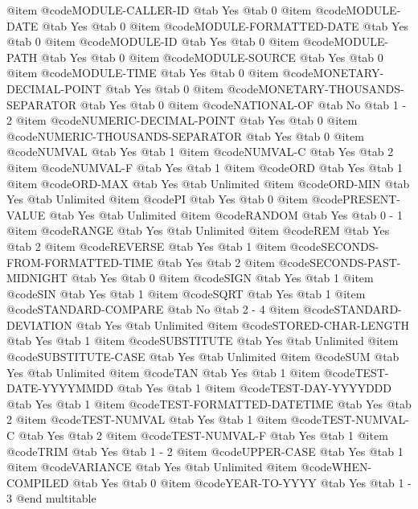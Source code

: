 @item @code{MODULE-CALLER-ID} @tab Yes @tab 0
@item @code{MODULE-DATE} @tab Yes @tab 0
@item @code{MODULE-FORMATTED-DATE} @tab Yes @tab 0
@item @code{MODULE-ID} @tab Yes @tab 0
@item @code{MODULE-PATH} @tab Yes @tab 0
@item @code{MODULE-SOURCE} @tab Yes @tab 0
@item @code{MODULE-TIME} @tab Yes @tab 0
@item @code{MONETARY-DECIMAL-POINT} @tab Yes @tab 0
@item @code{MONETARY-THOUSANDS-SEPARATOR} @tab Yes @tab 0
@item @code{NATIONAL-OF} @tab No @tab 1 - 2
@item @code{NUMERIC-DECIMAL-POINT} @tab Yes @tab 0
@item @code{NUMERIC-THOUSANDS-SEPARATOR} @tab Yes @tab 0
@item @code{NUMVAL} @tab Yes @tab 1
@item @code{NUMVAL-C} @tab Yes @tab 2
@item @code{NUMVAL-F} @tab Yes @tab 1
@item @code{ORD} @tab Yes @tab 1
@item @code{ORD-MAX} @tab Yes @tab Unlimited
@item @code{ORD-MIN} @tab Yes @tab Unlimited
@item @code{PI} @tab Yes @tab 0
@item @code{PRESENT-VALUE} @tab Yes @tab Unlimited
@item @code{RANDOM} @tab Yes @tab 0 - 1
@item @code{RANGE} @tab Yes @tab Unlimited
@item @code{REM} @tab Yes @tab 2
@item @code{REVERSE} @tab Yes @tab 1
@item @code{SECONDS-FROM-FORMATTED-TIME} @tab Yes @tab 2
@item @code{SECONDS-PAST-MIDNIGHT} @tab Yes @tab 0
@item @code{SIGN} @tab Yes @tab 1
@item @code{SIN} @tab Yes @tab 1
@item @code{SQRT} @tab Yes @tab 1
@item @code{STANDARD-COMPARE} @tab No @tab 2 - 4
@item @code{STANDARD-DEVIATION} @tab Yes @tab Unlimited
@item @code{STORED-CHAR-LENGTH} @tab Yes @tab 1
@item @code{SUBSTITUTE} @tab Yes @tab Unlimited
@item @code{SUBSTITUTE-CASE} @tab Yes @tab Unlimited
@item @code{SUM} @tab Yes @tab Unlimited
@item @code{TAN} @tab Yes @tab 1
@item @code{TEST-DATE-YYYYMMDD} @tab Yes @tab 1
@item @code{TEST-DAY-YYYYDDD} @tab Yes @tab 1
@item @code{TEST-FORMATTED-DATETIME} @tab Yes @tab 2
@item @code{TEST-NUMVAL} @tab Yes @tab 1
@item @code{TEST-NUMVAL-C} @tab Yes @tab 2
@item @code{TEST-NUMVAL-F} @tab Yes @tab 1
@item @code{TRIM} @tab Yes @tab 1 - 2
@item @code{UPPER-CASE} @tab Yes @tab 1
@item @code{VARIANCE} @tab Yes @tab Unlimited
@item @code{WHEN-COMPILED} @tab Yes @tab 0
@item @code{YEAR-TO-YYYY} @tab Yes @tab 1 - 3
@end multitable

